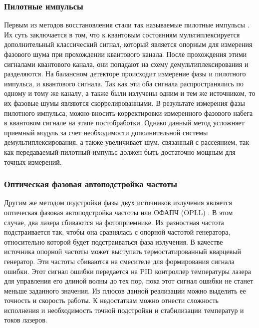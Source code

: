 \subsubsection{Пилотные импульсы}Первым из методов восстановления стали так называемые пилотные импульсы \cite{wang2020}. Их суть заключается в том, что к квантовым состояниям мультиплексируется дополнительный классический сигнал, который является опорным для измерения фазового шума при прохождении квантового канала. После прохождения этими сигналами квантового канала, они попадают на схему демультиплексирования и разделяются. На балансном детекторе происходит измерение фазы и пилотного импульса, и квантового сигнала. Так как эти оба сигнала распространялись по одному и тому же каналу, а также были излучены одним и тем же источником, то их фазовые шумы являются скоррелированными. В результате измерения фазы  пилотного импульса, можно вносить корректировки измеренного фазового набега в квантовом сигнале на этапе постобработки. 
\newline Однако данный метод усложняет приемный модуль за счет необходимости дополнительной системы демультиплексирования, а также увеличивает шум, связанный с рассеянием, так как передаваемый  пилотный импульс должен быть достаточно мощным для точных измерений.
\subsubsection{Оптическая фазовая автоподстройка частоты}
Другим же методом подстройки фазы двух источников излучения является оптическая фазовая автоподстройка частоты или ОФАПЧ (OPLL) \cite{khaksar2023}. В этом случае, два лазера сбиваются на фотоприемнике. Их разностная частота подстраивается так, чтобы она сравнялась с опорной частотой генератора, относительно которой будет подстраиваться фаза излучения. 
В качестве источника опорной частоты может выступать термостатированный кварцевый генератор. Эти частоты сбиваются на смесителе для формирования сигнала ошибки. Этот сигнал ошибки передается на PID контроллер температуры лазера для управления его длиной волны до тех пор, пока этот сигнал ошибки не станет меньше заданного значения.
Из плюсов данной реализации можно выделить ее точность и скорость работы. К недостаткам можно отнести сложность исполнения и необходимость точной подстройки и стабилизации температур и токов лазеров.

